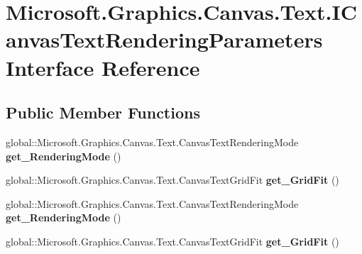 \hypertarget{interface_microsoft_1_1_graphics_1_1_canvas_1_1_text_1_1_i_canvas_text_rendering_parameters}{}\section{Microsoft.\+Graphics.\+Canvas.\+Text.\+I\+Canvas\+Text\+Rendering\+Parameters Interface Reference}
\label{interface_microsoft_1_1_graphics_1_1_canvas_1_1_text_1_1_i_canvas_text_rendering_parameters}
\subsection*{Public Member Functions}
\begin{DoxyCompactItemize}
\item 
\mbox{\label{interface_microsoft_1_1_graphics_1_1_canvas_1_1_text_1_1_i_canvas_text_rendering_parameters_ae6aa9931921dbb57a98f0e348f4ae032}} 
global\+::\+Microsoft.\+Graphics.\+Canvas.\+Text.\+Canvas\+Text\+Rendering\+Mode {\bfseries get\+\_\+\+Rendering\+Mode} ()
\item 
\mbox{\label{interface_microsoft_1_1_graphics_1_1_canvas_1_1_text_1_1_i_canvas_text_rendering_parameters_af9621754fdbe97ea8a90094bbdea3e5b}} 
global\+::\+Microsoft.\+Graphics.\+Canvas.\+Text.\+Canvas\+Text\+Grid\+Fit {\bfseries get\+\_\+\+Grid\+Fit} ()
\item 
\mbox{\label{interface_microsoft_1_1_graphics_1_1_canvas_1_1_text_1_1_i_canvas_text_rendering_parameters_ae6aa9931921dbb57a98f0e348f4ae032}} 
global\+::\+Microsoft.\+Graphics.\+Canvas.\+Text.\+Canvas\+Text\+Rendering\+Mode {\bfseries get\+\_\+\+Rendering\+Mode} ()
\item 
\mbox{\label{interface_microsoft_1_1_graphics_1_1_canvas_1_1_text_1_1_i_canvas_text_rendering_parameters_af9621754fdbe97ea8a90094bbdea3e5b}} 
global\+::\+Microsoft.\+Graphics.\+Canvas.\+Text.\+Canvas\+Text\+Grid\+Fit {\bfseries get\+\_\+\+Grid\+Fit} ()

\end{DoxyCompactItemize}
